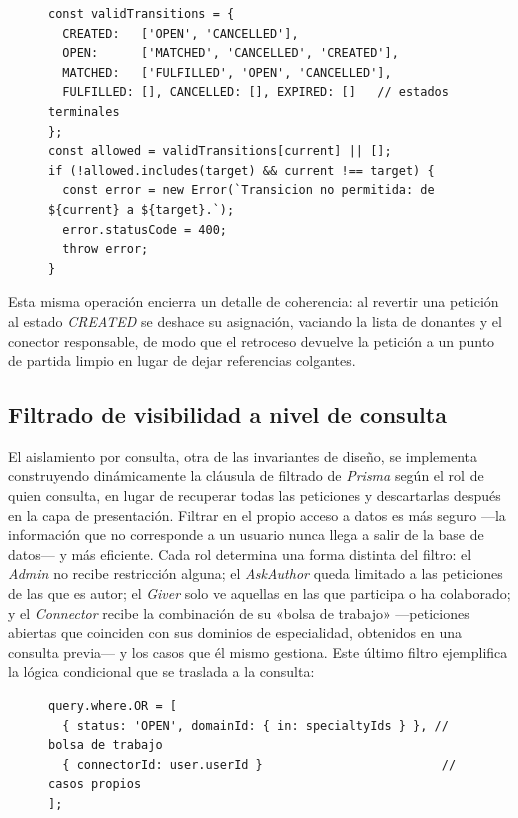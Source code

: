 \documentclass[11pt,oneside,spanish,listoffigures,listoftables]{tfgetsinf}
\begin{document}
\begin{figure}[htbp]
\begin{lstlisting}[caption={Tabla de transiciones que materializa la máquina de estados en la capa de servicio.}, label={lst:statemachine}]
const validTransitions = {
  CREATED:   ['OPEN', 'CANCELLED'],
  OPEN:      ['MATCHED', 'CANCELLED', 'CREATED'],
  MATCHED:   ['FULFILLED', 'OPEN', 'CANCELLED'],
  FULFILLED: [], CANCELLED: [], EXPIRED: []   // estados terminales
};
const allowed = validTransitions[current] || [];
if (!allowed.includes(target) && current !== target) {
  const error = new Error(`Transicion no permitida: de ${current} a ${target}.`);
  error.statusCode = 400;
  throw error;
}
\end{lstlisting}
\end{figure}

Esta misma operación encierra un detalle de coherencia: al revertir una petición al estado \textit{CREATED} se deshace su asignación, vaciando la lista de donantes y el conector responsable, de modo que el retroceso devuelve la petición a un punto de partida limpio en lugar de dejar referencias colgantes.

\subsection{Filtrado de visibilidad a nivel de consulta}

El aislamiento por consulta, otra de las invariantes de diseño, se implementa construyendo dinámicamente la cláusula de filtrado de \textit{Prisma} según el rol de quien consulta, en lugar de recuperar todas las peticiones y descartarlas después en la capa de presentación. Filtrar en el propio acceso a datos es más seguro —la información que no corresponde a un usuario nunca llega a salir de la base de datos— y más eficiente. Cada rol determina una forma distinta del filtro: el \textit{Admin} no recibe restricción alguna; el \textit{AskAuthor} queda limitado a las peticiones de las que es autor; el \textit{Giver} solo ve aquellas en las que participa o ha colaborado; y el \textit{Connector} recibe la combinación de su «bolsa de trabajo» —peticiones abiertas que coinciden con sus dominios de especialidad, obtenidos en una consulta previa— y los casos que él mismo gestiona. Este último filtro ejemplifica la lógica condicional que se traslada a la consulta:

\begin{figure}[htbp]
\begin{lstlisting}[caption={Construcción del filtro de visibilidad del \textit{Connector} sobre la consulta de \textit{Prisma}.}, label={lst:visibilidad}]
query.where.OR = [
  { status: 'OPEN', domainId: { in: specialtyIds } }, // bolsa de trabajo
  { connectorId: user.userId }                         // casos propios
];
\end{lstlisting}
\end{figure}
\end{document}
